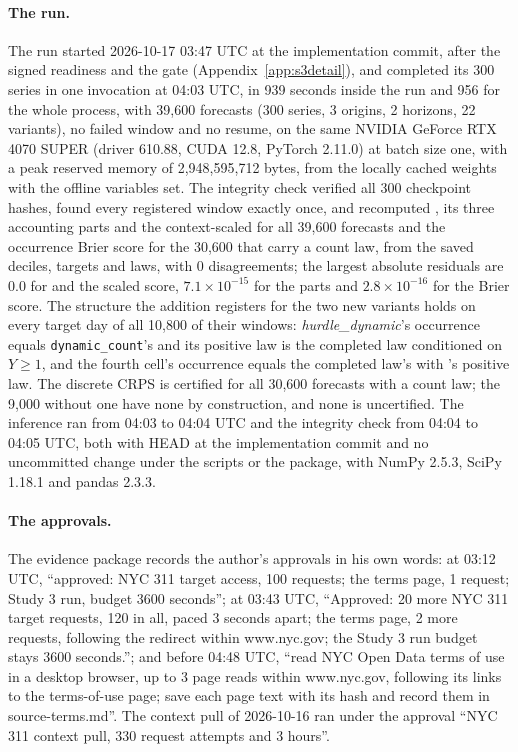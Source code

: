 \paragraph{The run.} The run started 2026-10-17 03:47 UTC at the implementation commit, after the signed
readiness and the gate (Appendix~\ref{app:s3detail}), and completed its 300 series in one invocation at
04:03 UTC, in 939 seconds inside the run and 956 for the whole process, with 39,600 forecasts (300 series, 3
origins, 2 horizons, 22 variants), no failed window and no resume, on the same NVIDIA GeForce RTX 4070
SUPER (driver 610.88, CUDA 12.8, PyTorch 2.11.0) at batch size one, with a peak reserved memory of
2,948,595,712 bytes, from the locally cached weights with the offline variables set. The integrity check
verified all 300 checkpoint hashes, found every registered window exactly once, and recomputed \qs{}, its
three accounting parts and the context-scaled \qs{} for all 39,600 forecasts and the occurrence Brier score
for the 30,600 that carry a count law, from the saved deciles, targets and laws, with 0 disagreements; the
largest absolute residuals are 0.0 for \qs{} and the scaled score, $7.1 \times 10^{-15}$ for the parts and
$2.8 \times 10^{-16}$ for the Brier score. The structure the addition registers for the two new variants holds
on every target day of all 10,800 of their windows: \emph{hurdle\_dynamic}'s occurrence equals
\texttt{dynamic\_count}'s and its positive law is the completed law conditioned on $Y \ge 1$, and the fourth
cell's occurrence equals the completed law's with \hc{}'s positive law. The discrete CRPS is certified for
all 30,600 forecasts with a count law; the 9,000 without one have none by construction, and none is
uncertified. The inference ran from 04:03 to 04:04 UTC and the integrity check from 04:04 to 04:05 UTC,
both with HEAD at the implementation commit and no uncommitted change under the scripts or the package,
with NumPy 2.5.3, SciPy 1.18.1 and pandas 2.3.3.

\paragraph{The approvals.} The evidence package records the author's approvals in his own words: at
03:12 UTC, ``approved: NYC 311 target access, 100 requests; the terms page, 1 request; Study 3 run, budget
3600 seconds''; at 03:43 UTC, ``Approved: 20 more NYC 311 target requests, 120 in all, paced 3 seconds
apart; the terms page, 2 more requests, following the redirect within www.nyc.gov; the Study 3 run budget
stays 3600 seconds.''; and before 04:48 UTC, ``read NYC Open Data terms of use in a desktop browser, up to
3 page reads within www.nyc.gov, following its links to the terms-of-use page; save each page text with its
hash and record them in source-terms.md''. The context pull of 2026-10-16 ran under the approval ``NYC 311
context pull, 330 request attempts and 3 hours''.

